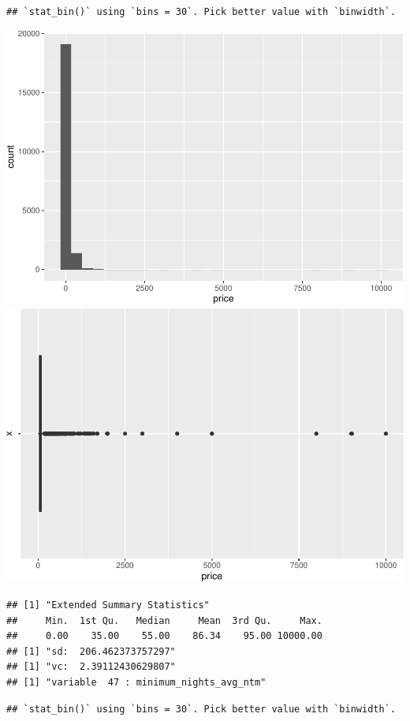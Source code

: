\begin{verbatim}
## `stat_bin()` using `bins = 30`. Pick better value with `binwidth`.
\end{verbatim}

\includegraphics{anal_files/figure-latex/unnamed-chunk-9-22.pdf}
\includegraphics{anal_files/figure-latex/unnamed-chunk-9-23.pdf}

\begin{verbatim}
## [1] "Extended Summary Statistics"
##     Min.  1st Qu.   Median     Mean  3rd Qu.     Max. 
##     0.00    35.00    55.00    86.34    95.00 10000.00 
## [1] "sd:  206.462373757297"
## [1] "vc:  2.39112430629807"
## [1] "variable  47 : minimum_nights_avg_ntm"
\end{verbatim}

\begin{verbatim}
## `stat_bin()` using `bins = 30`. Pick better value with `binwidth`.
\end{verbatim}

